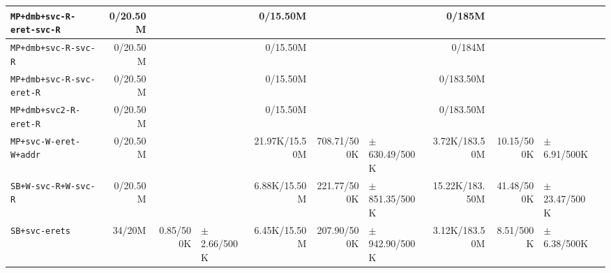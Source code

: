 \begin{tabular}{l  | r r l | r r l | r r l l}
   \verb|MP+dmb+svc-R-eret-svc-R| &       0/20.50M &                       &                 &       0/15.50M &                       &                   &         0/185M &                       &                  & \\ \hline 
        \verb|MP+dmb+svc-R-svc-R| &       0/20.50M &                       &                 &       0/15.50M &                       &                   &         0/184M &                       &                  & \\ \hline 
   \verb|MP+dmb+svc-R-svc-eret-R| &       0/20.50M &                       &                 &       0/15.50M &                       &                   &      0/183.50M &                       &                  & \\ \hline 
      \verb|MP+dmb+svc2-R-eret-R| &       0/20.50M &                       &                 &       0/15.50M &                       &                   &      0/183.50M &                       &                  & \\ \hline 
      \verb|MP+svc-W-eret-W+addr| &       0/20.50M &                       &                 &  21.97K/15.50M &           708.71/500K & $\pm$ 630.49/500K &  3.72K/183.50M &            10.15/500K &  $\pm$ 6.91/500K & \\ \hline 
        \verb|SB+W-svc-R+W-svc-R| &       0/20.50M &                       &                 &   6.88K/15.50M &           221.77/500K & $\pm$ 851.35/500K & 15.22K/183.50M &            41.48/500K & $\pm$ 23.47/500K & \\ \hline 
              \verb|SB+svc-erets| &         34/20M &             0.85/500K & $\pm$ 2.66/500K &   6.45K/15.50M &           207.90/500K & $\pm$ 942.90/500K &  3.12K/183.50M &             8.51/500K &  $\pm$ 6.38/500K & \\ \hline 
\end{tabular}
